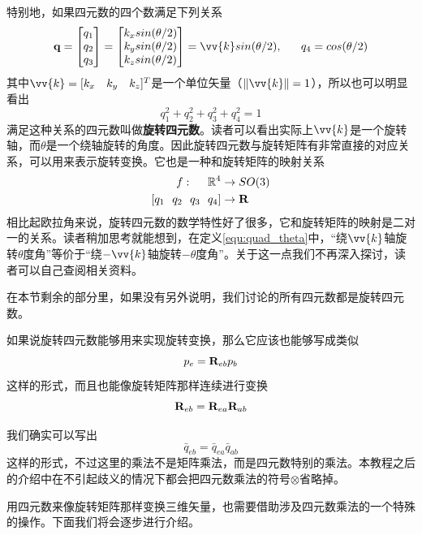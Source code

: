 \documentclass[11pt]{article}
\begin{document}
特别地，如果四元数的四个数满足下列关系
\begin{equation}\label{equ:quad_theta}
      \mathbf{q} = 
      \begin{bmatrix}
        q_1\\
        q_2\\
        q_3\\
      \end{bmatrix} =
      \begin{bmatrix}
        k_x sin(\theta/2)\\
        k_y sin(\theta/2)\\
        k_z sin(\theta/2)\\
      \end{bmatrix} =  \vv{k} sin(\theta/2),
      \ \ \ \ \ 
      q_4 = cos(\theta/2)
\end{equation}
其中$\vv{k} = [k_x \ \ \ k_y \ \ \ k_z]^T$是一个单位矢量（$\| \vv{k}\| = 1$），所以也可以明显看出
$$
q_1^2+q_2^2+q_3^2+q_4^2 = 1
$$
满足这种关系的四元数叫做\textbf{旋转四元数}。读者可以看出实际上$\vv{k}$是一个旋转轴，而$\theta$是一个绕轴旋转的角度。因此旋转四元数与旋转矩阵有非常直接的对应关系，可以用来表示旋转变换。它也是一种和旋转矩阵的映射关系
\begin{align*}
 f: \ \ \ \ \mathbb{R}^4 & \rightarrow SO(3) \\
	[q_1 \ \ q_2 \ \ q_3 \ \ q_4] & \rightarrow {\bf R}	
\end{align*}
相比起欧拉角来说，旋转四元数的数学特性好了很多，它和旋转矩阵的映射是二对一的关系。读者稍加思考就能想到，在定义\ref{equ:quad_theta}中，“绕$\vv{k}$轴旋转$\theta$度角”等价于“绕$-\vv{k}$轴旋转$-\theta$度角”。关于这一点我们不再深入探讨，读者可以自己查阅相关资料。

在本节剩余的部分里，如果没有另外说明，我们讨论的所有四元数都是旋转四元数。

如果说旋转四元数能够用来实现旋转变换，那么它应该也能够写成类似
$$
p_e = {\bf R}_{eb}p_b
$$
这样的形式，而且也能像旋转矩阵那样连续进行变换
$$
{\bf R}_{eb} = {\bf R}_{ea}{\bf R}_{ab}
$$

我们确实可以写出
$$
\bar{q}_{eb} = \bar{q}_{ea}\bar{q}_{ab}
$$
这样的形式，不过这里的乘法不是矩阵乘法，而是四元数特别的乘法。本教程之后的介绍中在不引起歧义的情况下都会把四元数乘法的符号$\otimes$省略掉。

用四元数来像旋转矩阵那样变换三维矢量，也需要借助涉及四元数乘法的一个特殊的操作。下面我们将会逐步进行介绍。
\end{document}
